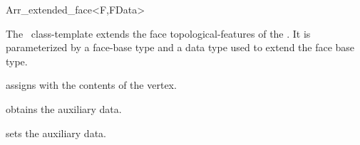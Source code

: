 
\ccRefPageBegin

\begin{ccRefClass}{Arr_extended_face<F,FData>}

\ccDefinition
  The \ccRefName\ class-template extends the face topological-features of the
  \dcel. It is parameterized by a face-base type  and a data type
   used to extend the face base type.


\ccIsModel

\ccInheritsFrom

\ccCreation
{}
  {assigns \ccVar{} with the contents of the  vertex.}

\ccAccessFunctions
  {obtains the auxiliary data.}

\ccModifiers
  {sets the auxiliary data.}

\ccSeeAlso

\end{ccRefClass}

\ccRefPageEnd
